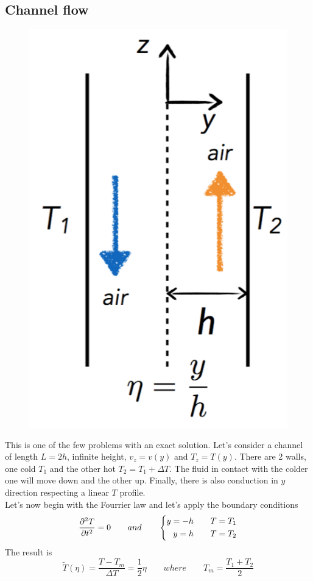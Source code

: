	\subsection{Channel flow}
		\begin{figure}
		\vspace{-5 mm}
		\includegraphics[scale=0.3]{ch5/12}
		\end{figure}			
		This is one of the few problems with an exact solution. Let's consider a channel of length $L=2h$, infinite height, $v_z = v(y)$ and $T_z = T(y)$. There are 2 walls, one cold $T_1$ and the other hot $T_2 = T_1 + \Delta T$. The fluid in contact with the colder one will move down and the other up. Finally, there is also conduction in $y$ direction respecting a linear $T$ profile. \\
		Let's now begin with the Fourrier law and let's apply the boundary conditions
		\begin{equation}
			\frac{\D ^2 T}{\D t^2} = 0  \qquad and \qquad 
			\left\{ 
			\begin{aligned}
				y =- h \qquad T &= T_1 \\
				y = h \qquad T &= T_2
			\end{aligned}
			\right.
		\end{equation}
		The result is 
		\begin{equation}
			\tilde{T} (\eta ) = \frac{T-T_m}{\Delta T} = \frac{1}{2} \eta \qquad where \qquad T_m = \frac{T_1 + T_2}{2}
		\end{equation}
		
